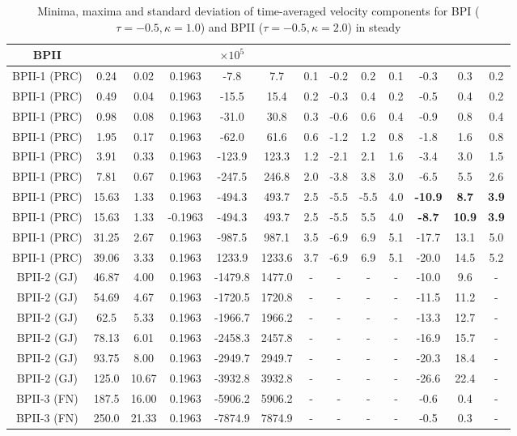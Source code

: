 \documentclass[8.5pt,twoside,twocolumn]{article}
\begin{document}
\begin{table}[htpb]
\begin{tabular}{|c||c|| c || c || c |c |c||c| c| c||c| c| c|}
BPII  & & & & $\times 10^5$ \\
\hline
BPII-1 (PRC) &0.24 &0.02 & 0.1963 &-7.8 &7.7 &0.1 &-0.2 &0.2 &0.1 &-0.3 &0.3 &0.2 \\
BPII-1 (PRC) &0.49 &0.04 & 0.1963 &-15.5 &15.4 &0.2 &-0.3 &0.4 &0.2 &-0.5 &0.4 &0.2 \\
BPII-1 (PRC) &0.98 &0.08 & 0.1963 &-31.0 &30.8 &0.3 &-0.6 &0.6 &0.4 &-0.9 &0.8 &0.4 \\
BPII-1 (PRC) &1.95 &0.17 & 0.1963 &-62.0 &61.6 &0.6 &-1.2 &1.2 &0.8 &-1.8 &1.6 &0.8 \\
BPII-1 (PRC) &3.91 &0.33 & 0.1963 &-123.9 &123.3 &1.2 &-2.1 &2.1 &1.6 &-3.4 &3.0 &1.5 \\
BPII-1 (PRC) &7.81 &0.67 & 0.1963 &-247.5 &246.8 &2.0 &-3.8 &3.8 &3.0 &-6.5 &5.5 &2.6 \\
BPII-1 (PRC) &15.63 &1.33 & 0.1963 &-494.3 &493.7 &2.5 &-5.5 &-5.5 &4.0 &\bf{-10.9} &\bf{8.7} &\bf{3.9} \\
BPII-1 (PRC) &15.63 &1.33 & -0.1963 &-494.3 &493.7 &2.5 &-5.5 &5.5 &4.0 &\bf{-8.7} &\bf{10.9} &\bf{3.9} \\
BPII-1 (PRC) &31.25 &2.67 & 0.1963 &-987.5 &987.1 &3.5 &-6.9 &6.9 &5.1 &-17.7 &13.1 &5.0 \\
BPII-1 (PRC) &39.06 &3.33 & 0.1963 &1233.9 &1233.6 &3.7 &-6.9 &6.9 &5.1 &-20.0 &14.5 &5.2 \\
\hline
BPII-2 (GJ) &46.87 &4.00 & 0.1963 &-1479.8 &1477.0 &- &- &- &- &-10.0 &9.6  &- \\
BPII-2 (GJ) &54.69 &4.67 & 0.1963 &-1720.5 &1720.8 &- &- &- &- &-11.5 &11.2 &- \\
BPII-2 (GJ) &62.5 &5.33 & 0.1963  &-1966.7 &1966.2 &- &- &- &- &-13.3 &12.7 &- \\
BPII-2 (GJ) &78.13 &6.01 & 0.1963 &-2458.3 &2457.8 &- &- &- &- &-16.9 &15.7 &- \\
BPII-2 (GJ) &93.75 &8.00 & 0.1963 &-2949.7 &2949.7 &- &- &- &- &-20.3 &18.4 &- \\
BPII-2 (GJ) &125.0 &10.67 &0.1963 &-3932.8 &3932.8 &- &- &- &- &-26.6 &22.4 &- \\
\hline
BPII-3 (FN) &187.5 &16.00 & 0.1963 &-5906.2  &5906.2 &- &-  &-  &-  &-0.6 &0.4 &- \\
BPII-3 (FN) &250.0 &21.33 & 0.1963 &-7874.9  &7874.9 &- &-  &-  &-  &-0.5 &0.3 &- \\
\hline
\end{tabular}
\caption{
Minima, maxima and standard deviation of time-averaged velocity components 
for BPI ($\tau=-0.5, \kappa=1.0$) and BPII ($\tau=-0.5, \kappa=2.0$) in steady 
}
\end{table}
\end{document}
